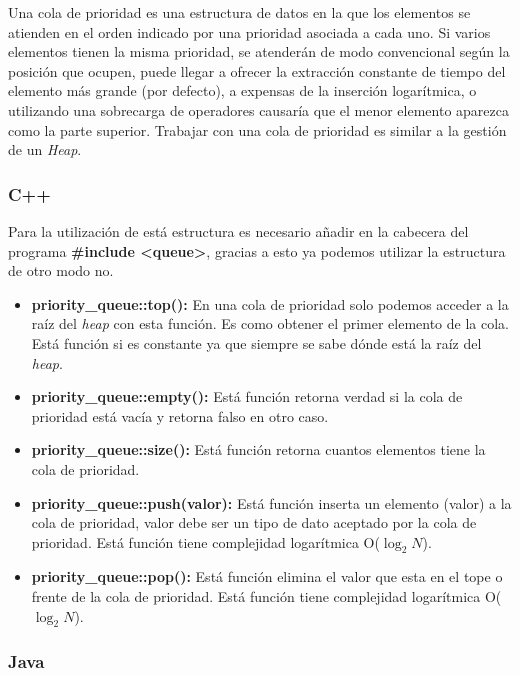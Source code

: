 Una cola de prioridad es una estructura de datos en la que los elementos se atienden en el orden
indicado por una prioridad asociada a cada uno. Si varios elementos tienen la misma prioridad, se
atenderán de modo convencional según la posición que ocupen, puede llegar a ofrecer la extracción
constante de tiempo del elemento más grande (por defecto), a expensas de la inserción logarítmica, o
utilizando una sobrecarga de operadores causaría que el menor elemento aparezca como la parte superior.
Trabajar con una cola de prioridad es similar a la gestión de un \emph{Heap}.

\subsubsection{C++}

Para la utilización de está estructura es necesario añadir en la cabecera del programa \textbf{\#include
<queue>}, gracias a esto ya podemos utilizar la estructura de otro modo no.

\begin{itemize}
	\item \textbf{priority\_queue::top():} En una cola de prioridad solo podemos acceder a la raíz del \emph{heap} con esta función. Es como obtener el primer elemento de la cola. Está función
si es constante ya que siempre se sabe dónde está la raíz del \emph{heap}.
	\item \textbf{priority\_queue::empty():} Está función retorna verdad si la cola de prioridad está vacía y retorna falso en otro
caso.
	\item \textbf{priority\_queue::size():} Está función retorna cuantos elementos tiene la cola de prioridad.
	\item \textbf{priority\_queue::push(valor):} Está función inserta un elemento (valor) a la cola de prioridad, valor debe ser un
tipo de dato aceptado por la cola de prioridad. Está función tiene complejidad
logarítmica O($\log_2 N$).
	\item \textbf{priority\_queue::pop():} Está función elimina el valor que esta en el tope o frente de la cola de prioridad. Está función tiene complejidad logarítmica O($\log_2 N$).
\end{itemize}

\subsubsection{Java}